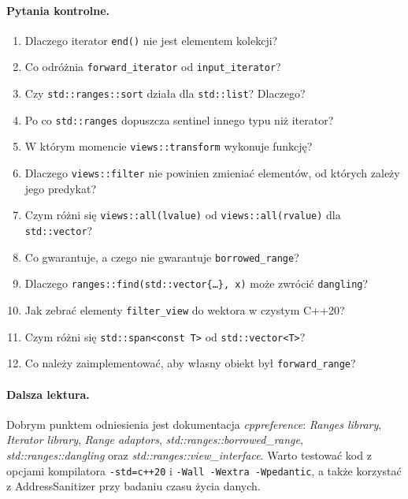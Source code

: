 \paragraph{Pytania kontrolne.}
\begin{enumerate}
\item Dlaczego iterator \texttt{end()} nie jest elementem kolekcji?
\item Co odróżnia \texttt{forward\_iterator} od \texttt{input\_iterator}?
\item Czy \texttt{std::ranges::sort} działa dla \texttt{std::list}? Dlaczego?
\item Po co \texttt{std::ranges} dopuszcza sentinel innego typu niż iterator?
\item W którym momencie \texttt{views::transform} wykonuje funkcję?
\item Dlaczego \texttt{views::filter} nie powinien zmieniać elementów, od których zależy jego predykat?
\item Czym różni się \texttt{views::all(lvalue)} od \texttt{views::all(rvalue)} dla \texttt{std::vector}?
\item Co gwarantuje, a czego nie gwarantuje \texttt{borrowed\_range}?
\item Dlaczego \texttt{ranges::find(std::vector\{\dots\}, x)} może zwrócić \texttt{dangling}?
\item Jak zebrać elementy \texttt{filter\_view} do wektora w czystym C++20?
\item Czym różni się \texttt{std::span<const T>} od \texttt{std::vector<T>}?
\item Co należy zaimplementować, aby własny obiekt był \texttt{forward\_range}?
\end{enumerate}

\paragraph{Dalsza lektura.}
Dobrym punktem odniesienia jest dokumentacja \emph{cppreference}:
\emph{Ranges library}, \emph{Iterator library}, \emph{Range adaptors},
\emph{std::ranges::borrowed\_range}, \emph{std::ranges::dangling}
oraz \emph{std::ranges::view\_interface}. Warto testować kod z opcjami kompilatora
\texttt{-std=c++20} i \texttt{-Wall -Wextra -Wpedantic},
a także korzystać z AddressSanitizer przy badaniu czasu życia danych.
